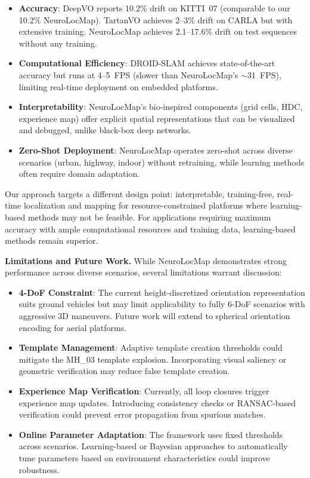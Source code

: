 \begin{itemize}
    \item \textbf{Accuracy}: DeepVO reports 10.2\% drift on KITTI~07 (comparable to our 10.2\% NeuroLocMap). TartanVO achieves 2--3\% drift on CARLA but with extensive training. NeuroLocMap achieves 2.1--17.6\% drift on test sequences without any training.

    \item \textbf{Computational Efficiency}: DROID-SLAM achieves state-of-the-art accuracy but runs at 4--5~FPS (slower than NeuroLocMap's $\sim$31~FPS), limiting real-time deployment on embedded platforms.

    \item \textbf{Interpretability}: NeuroLocMap's bio-inspired components (grid cells, HDC, experience map) offer explicit spatial representations that can be visualized and debugged, unlike black-box deep networks.

    \item \textbf{Zero-Shot Deployment}: NeuroLocMap operates zero-shot across diverse scenarios (urban, highway, indoor) without retraining, while learning methods often require domain adaptation.
\end{itemize}

Our approach targets a different design point: interpretable, training-free, real-time localization and mapping for resource-constrained platforms where learning-based methods may not be feasible. For applications requiring maximum accuracy with ample computational resources and training data, learning-based methods remain superior.

\textbf{Limitations and Future Work.} While NeuroLocMap demonstrates strong per\-for\-mance across diverse scenarios, several limitations warrant discussion:

\begin{itemize}
    \item \textbf{4-DoF Constraint}: The current height-discretized orientation representation suits ground vehicles but may limit applicability to fully 6-DoF scenarios with aggressive 3D maneuvers. Future work will extend to spherical orientation encoding for aerial platforms.

    \item \textbf{Template Man\-age\-ment}: Adaptive template creation thresholds could mitigate the MH\_03 template explosion. Incorporating visual saliency or geometric verification may reduce false template creation.

    \item \textbf{Experience Map Verification}: Currently, all loop closures trigger experience map updates. Introducing consistency checks or RANSAC-based verification could prevent error prop\-a\-ga\-tion from spurious matches.

    \item \textbf{Online Parameter Adaptation}: The framework uses fixed thresholds across scenarios. Learning-based or Bayesian approaches to automatically tune parameters based on environment characteristics could improve robustness.
\end{itemize}

